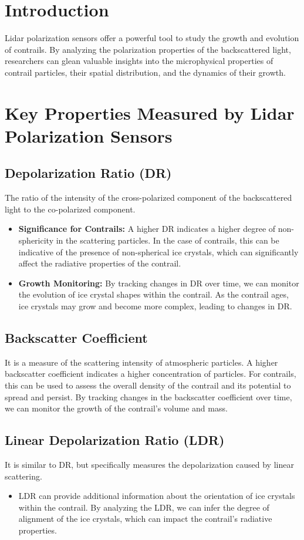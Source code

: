 \documentclass[a4paper, 12pt]{report}
\begin{document}
\section{Introduction}
Lidar polarization sensors offer a powerful tool to study the growth and evolution of contrails. By analyzing the polarization properties of the backscattered light, researchers can glean valuable insights into the microphysical properties of contrail particles, their spatial distribution, and the dynamics of their growth.

\section{Key Properties Measured by Lidar Polarization Sensors}
\subsection{Depolarization Ratio (DR)}
The ratio of the intensity of the cross-polarized component of the backscattered light to the co-polarized component.
\begin{itemize}
    \item \textbf{Significance for Contrails:} A higher DR indicates a higher degree of non-sphericity in the scattering particles. In the case of contrails, this can be indicative of the presence of non-spherical ice crystals, which can significantly affect the radiative properties of the contrail.
    \item \textbf{Growth Monitoring:} By tracking changes in DR over time, we can monitor the evolution of ice crystal shapes within the contrail. As the contrail ages, ice crystals may grow and become more complex, leading to changes in DR.
\end{itemize}

\subsection{Backscatter Coefficient}
It is a measure of the scattering intensity of atmospheric particles. A higher backscatter coefficient indicates a higher concentration of particles. For contrails, this can be used to assess the overall density of the contrail and its potential to spread and persist. By tracking changes in the backscatter coefficient over time, we can monitor the growth of the contrail's volume and mass.

\subsection{Linear Depolarization Ratio (LDR)}
It is similar to DR, but specifically measures the depolarization caused by linear scattering.
\begin{itemize}
    \item LDR can provide additional information about the orientation of ice crystals within the contrail. By analyzing the LDR, we can infer the degree of alignment of the ice crystals, which can impact the contrail's radiative properties.
\end{itemize}
\end{document}

